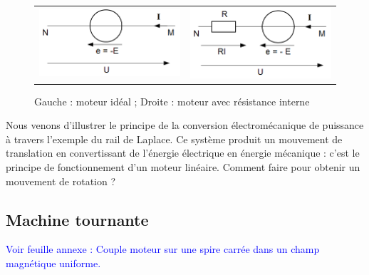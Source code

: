 \documentclass[11pt,a4paper]{report}
\begin{document}
\begin{figure}[h!]
	\begin{center}
		\begin{tabular}{cc}
			\includegraphics[scale=0.5]{rail_ideal.png} &
			\includegraphics[scale=0.5]{rail_reel.png} \\
		\end{tabular}
	\end{center}
	\caption{Gauche : moteur idéal ; Droite : moteur avec résistance interne}
	\label{ref:rail_modele}
\end{figure}

Nous venons d'illustrer le principe de la conversion électromécanique de puissance à travers l'exemple du rail de Laplace. Ce système produit un mouvement de translation en convertissant de l'énergie électrique en énergie mécanique : c'est le principe de fonctionnement d'un moteur linéaire. Comment faire pour obtenir un mouvement de rotation ?

\subsection{Machine tournante}

\textcolor{blue}{Voir feuille annexe : Couple moteur sur une spire carrée dans un champ magnétique uniforme.}\\
\end{document}
